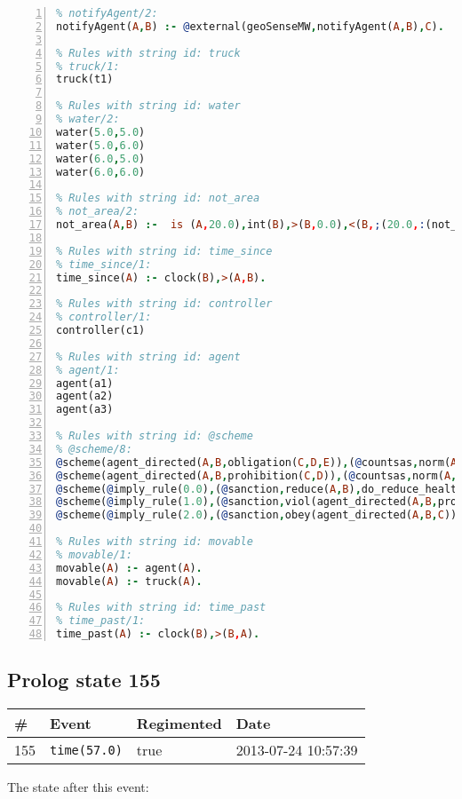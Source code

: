 \documentclass[11pt]{article}\usepackage[utf8]{inputenc}\usepackage{geometry}
\begin{document}
\begin{lstlisting}[language=Prolog, numbers=left]
% Rules with string id: notifyAgent
% notifyAgent/2:
notifyAgent(A,B) :- @external(geoSenseMW,notifyAgent(A,B),C).

% Rules with string id: truck
% truck/1:
truck(t1)

% Rules with string id: water
% water/2:
water(5.0,5.0)
water(5.0,6.0)
water(6.0,5.0)
water(6.0,6.0)

% Rules with string id: not_area
% not_area/2:
not_area(A,B) :-  is (A,20.0),int(B),>(B,0.0),<(B,;(20.0,:(not_area(A,B), is (-(B),20.0)))),int(A),>(A,0.0),<(A,;(20.0,:(area(A,B),-(int(A))))),int(B),>(A,0.0),>(B,0.0),<(A,21.0),<(B,21.0).

% Rules with string id: time_since
% time_since/1:
time_since(A) :- clock(B),>(A,B).

% Rules with string id: controller
% controller/1:
controller(c1)

% Rules with string id: agent
% agent/1:
agent(a1)
agent(a2)
agent(a3)

% Rules with string id: @scheme
% @scheme/8:
@scheme(agent_directed(A,B,obligation(C,D,E)),(@countsas,norm(A,B,F,obligation(C,D,E)),F),false,(listTrue(C)),(time_past(D)),false,[plus(viol(agent_directed(A,B,obligation(C,D,E))))|[]],[plus(obey(agent_directed(A,B,obligation(C,D,E))))|[]])
@scheme(agent_directed(A,B,prohibition(C,D)),(@countsas,norm(A,B,E,prohibition(C,D)),E),(listTrue(C)),false,(false),false,[plus(viol(agent_directed(A,B,prohibition(C,D))))|[]],[plus(obey(agent_directed(A,B,prohibition(C,D))))|[]])
@scheme(@imply_rule(0.0),(@sanction,reduce(A,B),do_reduce_health(A,B),notifyAgent(A,changed(status))),true,false,false,false,[min(reduce(A,B))|[]],[])
@scheme(@imply_rule(1.0),(@sanction,viol(agent_directed(A,B,prohibition(C,D))),do_sanction(D)),true,false,false,false,[min(viol(agent_directed(A,B,prohibition(C,D))))|[]],[])
@scheme(@imply_rule(2.0),(@sanction,obey(agent_directed(A,B,C))),true,false,false,false,[min(obey(agent_directed(A,B,C)))|[]],[])

% Rules with string id: movable
% movable/1:
movable(A) :- agent(A).
movable(A) :- truck(A).

% Rules with string id: time_past
% time_past/1:
time_past(A) :- clock(B),>(B,A).

\end{lstlisting}
\clearpage 
\subsection{Prolog state 155}
\begin{table}[ht]
\centering 
\begin{tabular}{l l l l} 
\textbf{\#} & \textbf{Event} & \textbf{Regimented} & \textbf{Date} \\ [0.5ex] 
\hline
155&\texttt{time(57.0)}&true&2013-07-24 10:57:39\\ [1ex] \hline\end{tabular}
\end{table}
The state after this event:
\end{document}
